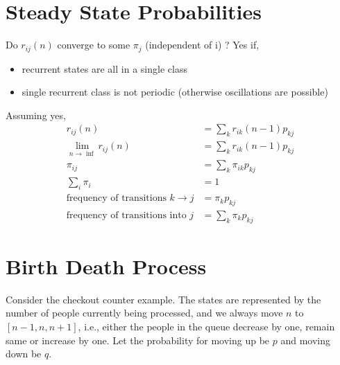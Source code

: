 \documentclass[../probability-notes.tex]{subfiles}
\begin{document}
    \section{Steady State Probabilities}
    \label{sec_markov_steady}
    Do $r_{ij}(n)$ converge to some $\pi_{j}$ (independent of i) ? \newline
    Yes if,
    \begin{itemize}
        \item recurrent states are all in a single class
        \item single recurrent class is not periodic (otherwise oscillations are possible)
    \end{itemize}
    Assuming yes,
    \begin{align*}
        r_{ij}(n) &= \sum_{k} r_{ik}(n-1)p_{kj}\\
        \lim_{n \to \inf} r_{ij}(n) &= \sum_{k} r_{ik}(n-1)p_{kj}\\
        \pi_{ij} &= \sum_{k} \pi_{ik} p_{kj} \tag*{balance equations} \\
        \sum_{i} \pi_{i} &= 1 \\
        \text{frequency of transitions $k \rightarrow j$} &= \pi_{k} p_{kj} \tag*{in one step}\\
        \text{frequency of transitions into $j$} &= \sum_{k} \pi_{k} p_{kj} \tag*{influx from all connected states}
    \end{align*}

    \section{Birth Death Process}
    Consider the checkout counter example. The states are represented by the number of people currently being processed, and we always move $n$ to $[n-1, n, n+1]$, i.e., either the people in the queue decrease by one, remain same or increase by one. Let the probability for moving up be $p$ and moving down be $q$.
\end{document}
